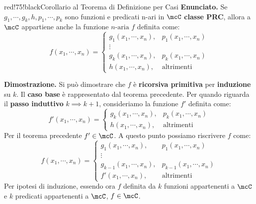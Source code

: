 \newpage

\begin{halfframedbox}{red!75!black}{Corollario al Teorema di Definizione per Casi}\label{Corollario al Teorema di Definizione per Casi}
  \textbf{Enunciato.} Se \(g_1,\cdots,g_k,h,p_1,\cdots,p_k\) sono funzioni e predicati n-ari in \(\mcC\) \textbf{classe PRC}, allora a \(\mcC\) appartiene anche la funzione \(n\text{-aria}\) \(f\) definita come:
  \begin{equation}
    f(x_1,\cdots,x_n)=\begin{cases}
                    g_1(x_1,\cdots,x_n), & p_1(x_1,\cdots,x_n)\\
                    \vdots \\
                    g_k(x_1,\cdots,x_n), & p_k(x_1,\cdots,x_n)\\
                    h(x_1,\cdots,x_n), & \text{altrimenti}
                    \end{cases}
  \end{equation}

  \begin{center}
    \textcolor{red!75!black}{\hdashrule[0.5ex]{18cm}{1pt}{3mm 3pt 1mm 2pt}}
  \end{center}

  \textbf{Dimostrazione.} Si può dimostrare che \(f\) è \textbf{ricorsiva primitiva} per \textbf{induzione} su \(k\). Il \textbf{caso base} è rappresentato dal teorema precedente.
  Per quando riguarda il \textbf{passo induttivo} \(k\implies k+1\), consideriamo la funzione \(f'\) definita come:
    \begin{equation}
      f'(x_1,\cdots,x_n)=\begin{cases}
                      g_k(x_1,\cdots,x_n), & p_k(x_1,\cdots,x_n)\\
                      h(x_1,\cdots,x_n), & \text{altrimenti}
                      \end{cases}
    \end{equation}
    Per il teorema precedente \(f' \in \mcC\).
    A questo punto possiamo riscrivere \(f\) come:
    \begin{equation}
      f(x_1,\cdots,x_n)=\begin{cases}
                      g_1(x_1,\cdots,x_n), & p_1(x_1,\cdots,x_n)\\
                      \vdots\\
                      g_{k-1}(x_1,\cdots,x_n), & p_{k-1}(x_1,\cdots,x_n)\\
                      f'(x_1,\cdots,x_n), & \text{altrimenti}
                      \end{cases}
    \end{equation}
    Per ipotesi di induzione, essendo ora \(f\) definita da \(k\) funzioni appartenenti a \(\mcC\) e \(k\) predicati appartenenti a \(\mcC\), \(f \in \mcC\).
  \end{halfframedbox}

